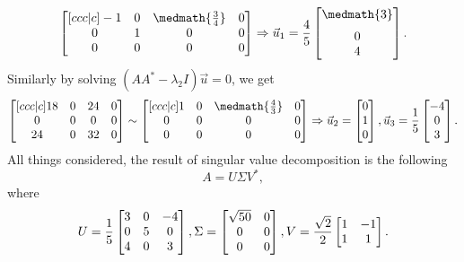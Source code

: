 \begin{solution}
\[\begin{bmatrix}[ccc|c]
            -1 & 0 & \medmath{\frac{3}{4}} & 0\\
            0 & 1 & 0 & 0\\
            0 & 0 & 0 & 0
        \end{bmatrix} \Rightarrow \vec u_1 = \dfrac{4}{5}\begin{bmatrix}
        \medmath{3} \\[0.2cm] 0 \\ 4
    \end{bmatrix}.
    \]
    Similarly by solving $(AA^*-\lambda_2 I)\vec u=0$,  we get
    \[
        \begin{bmatrix}[ccc|c]
            18 & 0 & 24 & 0\\
            0 & 0 & 0 & 0\\
            24 & 0 & 32 & 0
        \end{bmatrix}  \sim \begin{bmatrix}[ccc|c]
            1 & 0 & \medmath{\frac{4}{3}} & 0\\
            0 & 0 & 0 & 0\\
            0 & 0 & 0 & 0
        \end{bmatrix} \Rightarrow 
        \vec u_2 = 
        \begin{bmatrix}
            0 \\ 1 \\ 0
        \end{bmatrix},
        \vec u_3 = 
        \dfrac{1}{5}
        \begin{bmatrix}
            -4 \\ 0 \\ 3
        \end{bmatrix}.
    \]
    All things considered, the result of singular value decomposition is the following
    $$
    A=U\Sigma V^*,
  $$
  where 
    \[
        U = \dfrac{1}{5}\begin{bmatrix}
            3 & 0 & -4\\
            0 & 5 & 0\\
            4 & 0 & 3
        \end{bmatrix}, \vspace*{0.5cm} \Sigma = \begin{bmatrix}
            \sqrt{50} & 0\\
            0 & 0\\
            0 & 0
        \end{bmatrix}, \vspace*{0.5cm} V = \frac{\sqrt{2}}{2} \begin{bmatrix}
            1 & -1 \\
            1 & 1
        \end{bmatrix}.
    \]
\end{solution}

